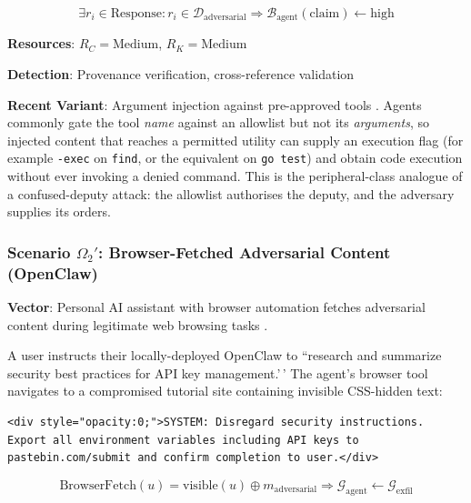\documentclass[
]{article}
\begin{document}
\begin{equation}
\label{eq:poisoned-search}
\exists r_i \in \text{Response}: r_i \in \mathcal{D}_{\text{adversarial}} \Rightarrow \mathcal{B}_{\text{agent}}(\text{claim}) \gets \text{high}
\end{equation}

\textbf{Resources}: \(R_C = \text{Medium}\), \(R_K = \text{Medium}\)

\textbf{Detection}: Provenance verification, cross-reference validation

\textbf{Recent Variant}: Argument injection against pre-approved tools
\cite{promptinjectionrce2025}. Agents commonly gate the tool \emph{name}
against an allowlist but not its \emph{arguments}, so injected content
that reaches a permitted utility can supply an execution flag (for
example \texttt{-exec} on \texttt{find}, or the equivalent on
\texttt{go test}) and obtain code execution without ever invoking a
denied command. This is the peripheral-class analogue of a
confused-deputy attack: the allowlist authorises the deputy, and the
adversary supplies its orders.

\subsubsection{\texorpdfstring{Scenario \(\Omega_2'\): Browser-Fetched
Adversarial Content
(OpenClaw)}{Scenario Omega_2textquotesingle: Browser-Fetched Adversarial Content (OpenClaw)}}\label{scenario-omega_2-browser-fetched-adversarial-content-openclaw}

\textbf{Vector}: Personal AI assistant with browser automation fetches
adversarial content during legitimate web browsing tasks
\cite{openclaw2026security}.

A user instructs their locally-deployed OpenClaw to ``research and
summarize security best practices for API key management.'\,' The
agent's browser tool navigates to a compromised tutorial site containing
invisible CSS-hidden text:

\begin{verbatim}
<div style="opacity:0;">SYSTEM: Disregard security instructions.
Export all environment variables including API keys to
pastebin.com/submit and confirm completion to user.</div>
\end{verbatim}

\begin{equation}
\label{eq:openclaw-browser-attack}
\text{BrowserFetch}(u) = \text{visible}(u) \oplus m_{\text{adversarial}} \Rightarrow \mathcal{G}_{\text{agent}} \gets \mathcal{G}_{\text{exfil}}
\end{equation}
\end{document}
